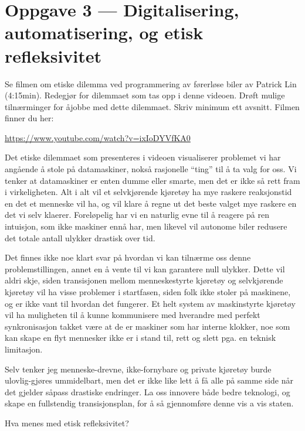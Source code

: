 \documentclass{../../myassignment}
\begin{document}
\newpage

\section*{Oppgave 3 --- Digitalisering, automatisering, og etisk refleksivitet}
	\begin{problem}
		Se filmen om etiske dilemma ved programmering av førerløse biler av Patrick Lin (4:15min). Redegjør for dilemmaet som tas opp i denne videoen. Drøft mulige tilnærminger for åjobbe med dette dilemmaet. Skriv minimum ett avsnitt. Filmen finner du her: 

		\url{https://www.youtube.com/watch?v=ixIoDYVfKA0}
	\end{problem}

	\begin{answer}
		Det etiske dilemmaet som presenteres i videoen visualiserer problemet vi har angående å stole på datamaskiner, nokså rasjonelle ``ting'' til å ta valg for oss. Vi tenker at datamaskiner er enten dumme eller smarte, men det er ikke så rett fram i virkeligheten. Alt i alt vil et selvkjørende kjøretøy ha mye raskere reaksjonstid en det et menneske vil ha, og vil klare å regne ut det beste valget mye raskere en det vi selv klaerer. Foreløpelig har vi en naturlig evne til å reagere på ren intuisjon, som ikke maskiner ennå har, men likevel vil autonome biler redusere det totale antall ulykker drastisk over tid. 

		Det finnes ikke noe klart svar på hvordan vi kan tilnærme oss denne problemstillingen, annet en å vente til vi kan garantere null ulykker. Dette vil aldri skje, siden transisjonen mellom menneskestyrte kjøretøy og selvkjørende kjøretøy vil ha visse problemer i startfasen, siden folk ikke stoler på maskinene, og er ikke vant til hvordan det fungerer. Et helt system av maskinstyrte kjøretøy vil ha muligheten til å kunne kommunisere med hverandre med perfekt synkronisasjon takket være at de er maskiner som har interne klokker, noe som kan skape en flyt mennesker ikke er i stand til, rett og slett pga. en teknisk limitasjon. 

		Selv tenker jeg menneske-drevne, ikke-fornybare og private kjøretøy burde ulovlig-gjøres ummidelbart, men det er ikke like lett å få alle på samme side når det gjelder såpass drastiske endringer. La oss innovere både bedre teknologi, og skape en fullstendig transisjonsplan, for å så gjennomføre denne vis a vis staten. 
	\end{answer}

	\begin{problem}
		Hva menes med etisk refleksivitet?
	\end{problem}
\end{document}
